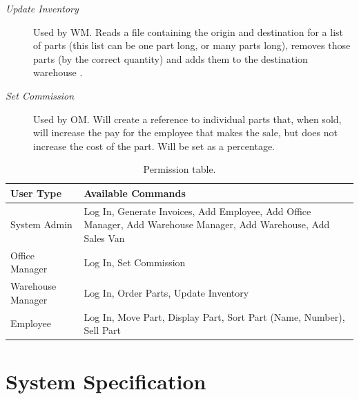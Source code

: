 \documentclass{report}
\begin{document}
\begin{description}
  \item [\textit{Update Inventory}] Used by WM. Reads a file containing the origin and destination for a list of parts (this list can be one part long, or many parts long), removes those parts (by the correct quantity) and adds them to the destination warehouse .
  \item [\textit{Set Commission}] Used by OM. Will create a reference to individual parts that, when sold, will increase the pay for the employee that makes the sale, but does not increase the cost of the part. Will be set as a percentage.
\end{description}

\begin{table}[htb]
  \begin{center}
      \begin{tabular}{ | l | p{8cm} |}
      \hline
      User Type & Available Commands \\ \hline
      System Admin & Log In, Generate Invoices, Add Employee, Add Office Manager, Add Warehouse Manager, Add Warehouse, Add Sales Van \\ \hline
      Office Manager & Log In, Set Commission\\ \hline
      Warehouse Manager & Log In, Order Parts, Update Inventory \\ \hline
      Employee & Log In, Move Part, Display Part, Sort Part (Name, Number), Sell Part \\
      \hline
      \end{tabular}
  \end{center}
  \caption{Permission table.}
\end{table}

\section{System Specification}
\end{document}
